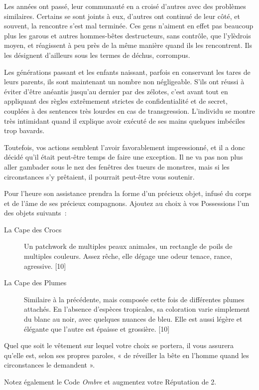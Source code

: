 \documentclass{report}
\begin{document}
Les années ont passé, leur communauté en a croisé d'autres avec des problèmes similaires. Certains se sont joints à eux, d'autres ont continué de leur côté, et souvent, la rencontre s'est mal terminée. Ces gens n'aiment en effet pas beaucoup plus les garous et autres hommes-bêtes destructeurs, sans contrôle, que l'ylèdrois moyen, et réagissent à peu près de la même manière quand ils les rencontrent. Ils les désignent d'ailleurs sous les termes de déchus, corrompus.

Les générations passant et les enfants naissant, parfois en conservant les tares de leurs parents, ils sont maintenant un nombre non négligeable. S'ils ont réussi à éviter d'être anéantis jusqu'au dernier par des zélotes, c'est avant tout en appliquant des règles extrêmement strictes de confidentialité et de secret, couplées à des sentences très lourdes en cas de transgression. L'individu se montre très intimidant quand il explique avoir exécuté de ses mains quelques imbéciles trop bavards.

Toutefois, vos actions semblent l'avoir favorablement impressionné, et il a donc décidé qu'il était peut-être temps de faire une exception. Il ne va pas non plus aller gambader sous le nez des fenêtres des tueurs de monstres, mais si les circonstances s'y prêtaient, il pourrait peut-être vous soutenir.

Pour l'heure son assistance prendra la forme d'un précieux objet, infusé du corps et de l'âme de ses précieux compagnons. Ajoutez au choix à vos Possessions l'un des objets suivants :
\begin{description}
\item[La Cape des Crocs] Un patchwork de multiples peaux animales, un rectangle de poils de multiples couleurs. Assez rêche, elle dégage une odeur tenace, rance, agressive. [10]
\item[La Cape des Plumes] Similaire à la précédente, mais composée cette fois de différentes plumes attachés. En l'absence d'espèces tropicales, sa coloration varie simplement du blanc au noir, avec quelques nuances de bleu. Elle est aussi légère et élégante que l'autre est épaisse et grossière. [10]
\end{description}

Quel que soit le vêtement sur lequel votre choix se portera, il vous assurera qu'elle est, selon ses propres paroles, « de réveiller la bête en l'homme quand les circonstances le demandent ».

Notez également le Code \emph{Ombre} et augmentez votre Réputation de 2.
\end{document}
